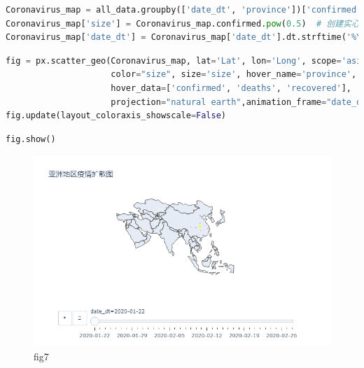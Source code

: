 \documentclass[UTF8,a4paper,12pt]{ctexart}  %
\begin{document}
\begin{lstlisting}[language=Python]
Coronavirus_map = all_data.groupby(['date_dt', 'province'])['confirmed', 'deaths','recovered', 'Lat', 'Long'].max().reset_index()
Coronavirus_map['size'] = Coronavirus_map.confirmed.pow(0.5)  # 创建实心圆大小
Coronavirus_map['date_dt'] = Coronavirus_map['date_dt'].dt.strftime('%Y-%m-%d')
\end{lstlisting}

\begin{lstlisting}[language=Python]
fig = px.scatter_geo(Coronavirus_map, lat='Lat', lon='Long', scope='asia',
                     color="size", size='size', hover_name='province',
                     hover_data=['confirmed', 'deaths', 'recovered'],
                     projection="natural earth",animation_frame="date_dt",title='亚洲地区疫情扩散图')
fig.update(layout_coloraxis_showscale=False)
\end{lstlisting}

\begin{lstlisting}[language=Python]
fig.show()
\end{lstlisting}

\begin{figure}
\centering
\includegraphics{./fig7.png}
\caption{fig7}
\end{figure}
\end{document}
